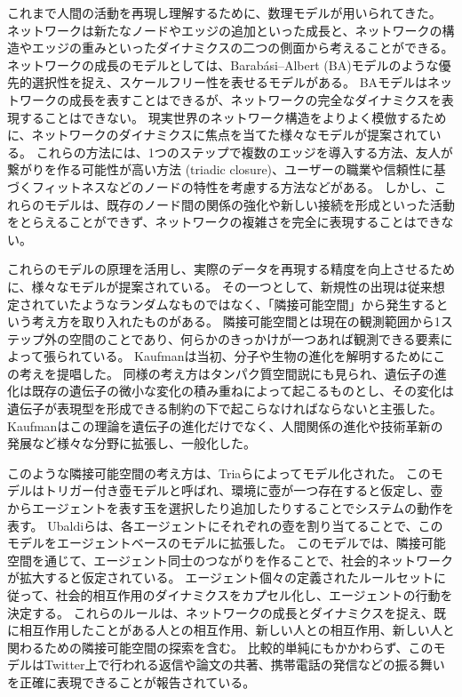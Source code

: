 \documentclass[uplatex,11pt,openany]{ujreport}
\begin{document}
    これまで人間の活動を再現し理解するために、数理モデルが用いられてきた。
    ネットワークは新たなノードやエッジの追加といった成長と、ネットワークの構造やエッジの重みといったダイナミクスの二つの側面から考えることができる。
    ネットワークの成長のモデルとしては、Barab\'{a}si--Albert (BA)モデルのような優先的選択性を捉え、スケールフリー性を表せるモデルがある\cite{barabasiEmergenceScalingRandom1999, barabasiOriginBurstsHeavy2005,barabasiScaleFreeNetworksDecade2009}。
    BAモデルはネットワークの成長を表すことはできるが、ネットワークの完全なダイナミクスを表現することはできない。
    現実世界のネットワーク構造をよりよく模倣するために、ネットワークのダイナミクスに焦点を当てた様々なモデルが提案されている。
    これらの方法には、1つのステップで複数のエッジを導入する方法\cite{albertTopologyEvolvingNetworks2000}、友人が繋がりを作る可能性が高い方法 (triadic closure\cite{bianconiTriadicClosureBasic2014})、ユーザーの職業や信頼性に基づくフィットネスなどのノードの特性を考慮する方法\cite{topirceanuWeightedBetweennessPreferential2018}などがある。
    しかし、これらのモデルは、既存のノード間の関係の強化や新しい接続を形成といった活動をとらえることができず、ネットワークの複雑さを完全に表現することはできない。

    これらのモデルの原理を活用し、実際のデータを再現する精度を向上させるために、様々なモデルが提案されている。
    その一つとして、新規性の出現は従来想定されていたようなランダムなものではなく、「隣接可能空間」から発生するという考え方を取り入れたものがある\cite{monechiWavesNoveltiesExpansion2017,sudaExplorationExploitationAdjacent2022, ubaldiEmergenceEvolutionSocial2021}。
    隣接可能空間とは現在の観測範囲から1ステップ外の空間のことであり、何らかのきっかけが一つあれば観測できる要素によって張られている。
    Kaufmanは当初、分子や生物の進化を解明するためにこの考えを提唱した\cite{kauffmanOriginsOrderSelforganization1993}。
    同様の考え方はタンパク質空間説にも見られ、遺伝子の進化は既存の遺伝子の微小な変化の積み重ねによって起こるものとし、その変化は遺伝子が表現型を形成できる制約の下で起こらなければならないと主張した\cite{maynardsmithNaturalSelectionConcept1970}。
    Kaufmanはこの理論を遺伝子の進化だけでなく、人間関係の進化や技術革新の発展など様々な分野に拡張し、一般化した。

    このような隣接可能空間の考え方は、Triaら\cite{triaDynamicsCorrelatedNovelties2014}によってモデル化された。
    このモデルはトリガー付き壺モデルと呼ばれ、環境に壺が一つ存在すると仮定し、壺からエージェントを表す玉を選択したり追加したりすることでシステムの動作を表す。
    Ubaldiらは、各エージェントにそれぞれの壺を割り当てることで、このモデルをエージェントベースのモデルに拡張した\cite{ubaldiEmergenceEvolutionSocial2021}。
    このモデルでは、隣接可能空間を通じて、エージェント同士のつながりを作ることで、社会的ネットワークが拡大すると仮定されている。
    エージェント個々の定義されたルールセットに従って、社会的相互作用のダイナミクスをカプセル化し、エージェントの行動を決定する。
    これらのルールは、ネットワークの成長とダイナミクスを捉え、既に相互作用したことがある人との相互作用、新しい人との相互作用、新しい人と関わるための隣接可能空間の探索を含む。
    比較的単純にもかかわらず、このモデルはTwitter上で行われる返信や論文の共著、携帯電話の発信などの振る舞いを正確に表現できることが報告されている\cite{ubaldiEmergenceEvolutionSocial2021}。
\end{document}
